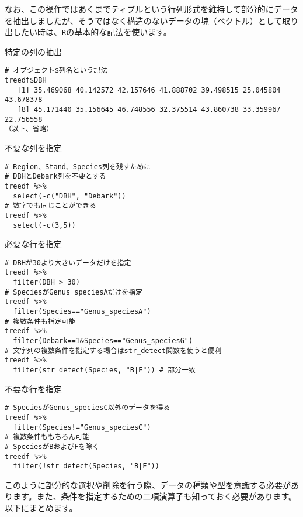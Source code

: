 なお、この操作ではあくまでティブルという行列形式を維持して部分的にデータを抽出しましたが、そうではなく構造のないデータの塊（ベクトル）として取り出したい時は、\texttt{R}の基本的な記法を使います。
\begin{itembox}[l]{特定の列の抽出}
\begin{verbatim}
# オブジェクト$列名という記法
treedf$DBH
   [1] 35.469068 40.142572 42.157646 41.888702 39.498515 25.045804 43.678378
   [8] 45.171440 35.156645 46.748556 32.375514 43.860738 33.359967 22.756558
（以下、省略）
\end{verbatim}
\end{itembox}

\begin{itembox}[l]{不要な列を指定}
\begin{verbatim}
# Region、Stand、Species列を残すために
# DBHとDebark列を不要とする
treedf %>%
  select(-c("DBH", "Debark"))
# 数字でも同じことができる
treedf %>%
  select(-c(3,5))
\end{verbatim}
\end{itembox}

\begin{itembox}[l]{必要な行を指定}
\begin{verbatim}
# DBHが30より大きいデータだけを指定
treedf %>%
  filter(DBH > 30)
# SpeciesがGenus_speciesAだけを指定
treedf %>%
  filter(Species=="Genus_speciesA")
# 複数条件も指定可能
treedf %>%
  filter(Debark==1&Species=="Genus_speciesG")
# 文字列の複数条件を指定する場合はstr_detect関数を使うと便利
treedf %>%
  filter(str_detect(Species, "B|F")) # 部分一致
\end{verbatim}
\end{itembox}

\begin{itembox}[l]{不要な行を指定}
\begin{verbatim}
# SpeciesがGenus_speciesC以外のデータを得る
treedf %>%
  filter(Species!="Genus_speciesC")
# 複数条件ももちろん可能
# SpeciesがBおよびFを除く
treedf %>%
  filter(!str_detect(Species, "B|F"))
\end{verbatim}
\end{itembox}

このように部分的な選択や削除を行う際、データの種類や型を意識する必要があります。また、条件を指定するための二項演算子も知っておく必要があります。以下にまとめます。

